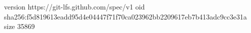 version https://git-lfs.github.com/spec/v1
oid sha256:f5d819613eadd95d4e04447f71f70ca023962bb2209617eb7b413adc9cc3e31a
size 35869
